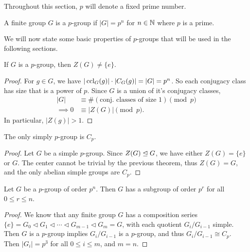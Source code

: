 \documentclass[a4paper]{scrartcl}
\begin{document}

Throughout this section, $p$ will denote a fixed prime number.

\begin{definition}[$p$-group]
	A finite group $G$ is a $p$-group if $|G| = p^n$ for $n \in \mathbb{N}$ where $p$ is a prime.
\end{definition}


We will now state some basic properties of $p$-groups that will be used in the following sections.

\begin{theorem}
	If $G$ is a $p$-group, then $Z(G) \neq \{e\}$.
\end{theorem}
\begin{proof}
	For $g \in G$, we have $|\operatorname{ccl}_G(g)| \cdot |C_G(g)| = |G| = p^n$. So each conjugacy class has size that is a power of $p$. 
	Since $G$ is a union of it's conjugacy classes, 
	\begin{align*}
		|G| &\equiv \#(\text{conj. classes of size 1}) \pmod{p}  \\
\implies 0 &\equiv |Z(G)| \pmod{p}.
	\end{align*}
	In particular, $|Z(g)| > 1$.
\end{proof}

\begin{corollary}
	The only simply $p$-group is $C_p$.
\end{corollary}
\begin{proof}
	Let $G$ be a simple $p$-group. Since $Z(G) \trianglelefteq G$, we have either $Z(G) = \{e\}$ or $G$. The center cannot be trivial by the previous theorem, thus $Z(G) = G$, and the only abelian simple groups are $C_p$.
\end{proof}

\begin{corollary}
	Let $G$ be a $p$-group of order $p^n$. Then $G$ has a subgroup of order $p^r$ for all $0 \leq r \leq n$.
\end{corollary}
\begin{proof}
	We know that any finite group $G$ has a composition series $\{e\} = G_0 \triangleleft G_1 \triangleleft \cdots \triangleleft G_{m - 1} \triangleleft G_m = G$, with each quotient $G_i / G_{i - 1}$ simple. Then $G$ is a $p$-group implies $G_i/G_{i - 1}$ is a $p$-group, and thus $G_i/G_{i - 1} \cong C_p$. Then $|G_i| = p^3$ for all $0 \leq i \leq m$, and $m = n$. 
\end{proof}
\end{document}
